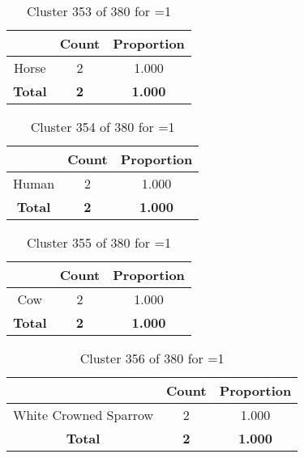 \begin{table}[ht!]
\centering
\begin{tabular}{|c|c|c|}
\hline
\bf \Spec{} &\bf Count &\bf Proportion\\ \hline \hline
Horse & 2 & 1.000\\ \hline
\hline
\bf Total & \bf 2 & \bf 1.000\\ \hline
\end{tabular}
\label{tab:cluster:353:1}
\caption{Cluster 353 of 380 for \minneigh{}=1}
\end{table}

\begin{table}[ht!]
\centering
\begin{tabular}{|c|c|c|}
\hline
\bf \Spec{} &\bf Count &\bf Proportion\\ \hline \hline
Human & 2 & 1.000\\ \hline
\hline
\bf Total & \bf 2 & \bf 1.000\\ \hline
\end{tabular}
\label{tab:cluster:354:1}
\caption{Cluster 354 of 380 for \minneigh{}=1}
\end{table}

\begin{table}[ht!]
\centering
\begin{tabular}{|c|c|c|}
\hline
\bf \Spec{} &\bf Count &\bf Proportion\\ \hline \hline
Cow & 2 & 1.000\\ \hline
\hline
\bf Total & \bf 2 & \bf 1.000\\ \hline
\end{tabular}
\label{tab:cluster:355:1}
\caption{Cluster 355 of 380 for \minneigh{}=1}
\end{table}

\begin{table}[ht!]
\centering
\begin{tabular}{|c|c|c|}
\hline
\bf \Spec{} &\bf Count &\bf Proportion\\ \hline \hline
White Crowned Sparrow & 2 & 1.000\\ \hline
\hline
\bf Total & \bf 2 & \bf 1.000\\ \hline
\end{tabular}
\label{tab:cluster:356:1}
\caption{Cluster 356 of 380 for \minneigh{}=1}
\end{table}

